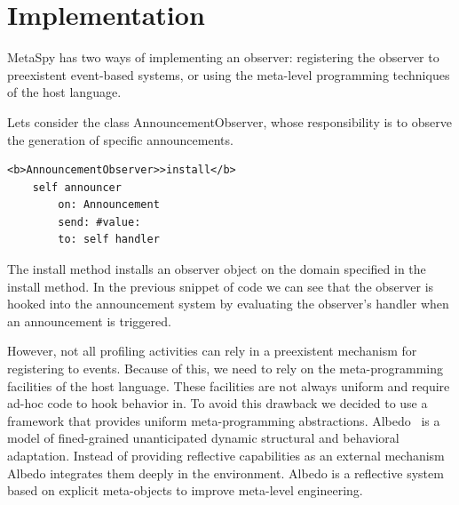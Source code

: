 \documentclass[runningheads]{llncs}
\newcommand{\project}{{\sc MetaSpy}\xspace}
\newcommand{\lr}[1]{\nb{Lukas}{orange}{#1}}
\newcommand{\jr}[1]{\nb{Jorge}{cyan}{#1}}
\newcommand{\seclabel}[1]{\label{sec:#1}}
\newcommand{\co}[1]{{\sf #1}}
\begin{document}
\section{Implementation}\seclabel{implementation}



\project has two ways of implementing an observer: registering the observer to preexistent event-based systems, or using the meta-level programming techniques of the host language.

Lets consider the class \co{AnnouncementObserver}, whose responsibility is to observe the generation of specific announcements.

\begin{lstlisting}
<b>AnnouncementObserver>>install</b>
    self announcer 
        on: Announcement 
        send: #value: 
        to: self handler
\end{lstlisting}

The \co{install} method installs an observer object on the domain specified in the \co{install} method. In the previous snippet of code we can see that the observer is hooked into the announcement system by evaluating the observer's handler when an announcement is triggered.

However, not all profiling activities can rely in a preexistent mechanism for registering to events. Because of this, we need to rely on the meta-programming facilities of the host language.
These facilities are not always uniform and require ad-hoc code to hook behavior in.
To avoid this drawback we decided to use a framework that provides uniform meta-programming abstractions.
Albedo~\cite{Ress10a} is a model of fined-grained unanticipated dynamic structural and behavioral adaptation. Instead of providing reflective capabilities as an external mechanism Albedo integrates them deeply in the environment. 
Albedo is a reflective system based on explicit meta-objects to improve meta-level engineering.
\end{document}
